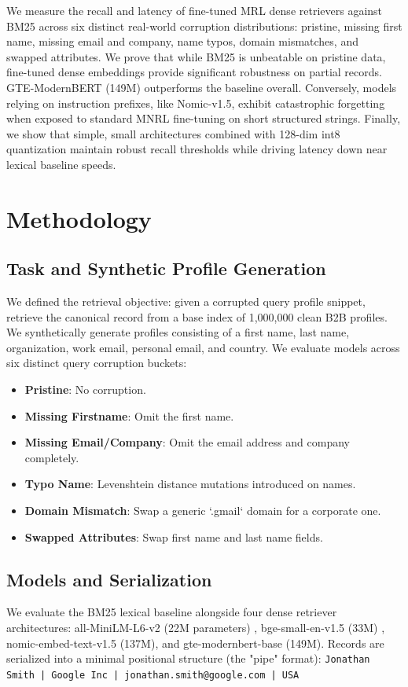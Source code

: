\documentclass{article}
\begin{document}
We measure the recall and latency of fine-tuned MRL dense retrievers against BM25 across six distinct real-world corruption distributions: pristine, missing first name, missing email and company, name typos, domain mismatches, and swapped attributes.
We prove that while BM25 is unbeatable on pristine data, fine-tuned dense embeddings provide significant robustness on partial records. GTE-ModernBERT (149M) outperforms the baseline overall. Conversely, models relying on instruction prefixes, like Nomic-v1.5, exhibit catastrophic forgetting when exposed to standard MNRL fine-tuning on short structured strings. Finally, we show that simple, small architectures combined with 128-dim int8 quantization maintain robust recall thresholds while driving latency down near lexical baseline speeds.

\section{Methodology}

\subsection{Task and Synthetic Profile Generation}
We defined the retrieval objective: given a corrupted query profile snippet, retrieve the canonical record from a base index of 1,000,000 clean B2B profiles. 
We synthetically generate profiles consisting of a first name, last name, organization, work email, personal email, and country.
We evaluate models across six distinct query corruption buckets:
\begin{itemize}
    \item \textbf{Pristine}: No corruption.
    \item \textbf{Missing Firstname}: Omit the first name.
    \item \textbf{Missing Email/Company}: Omit the email address and company completely.
    \item \textbf{Typo Name}: Levenshtein distance mutations introduced on names.
    \item \textbf{Domain Mismatch}: Swap a generic `.gmail` domain for a corporate one.
    \item \textbf{Swapped Attributes}: Swap first name and last name fields.
\end{itemize}

\subsection{Models and Serialization}
We evaluate the BM25 lexical baseline alongside four dense retriever architectures: all-MiniLM-L6-v2 (22M parameters) \cite{reimers2019sentence}, bge-small-en-v1.5 (33M) \cite{wang-etal-2022-text}, nomic-embed-text-v1.5 (137M), and gte-modernbert-base (149M).
Records are serialized into a minimal positional structure (the "pipe" format):
\texttt{Jonathan Smith | Google Inc | jonathan.smith@google.com | USA}
\end{document}
